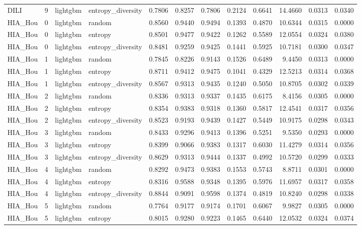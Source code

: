 \begin{tabular}{lrllrrrrrrrr}
DILI & 9 & lightgbm & entropy_diversity & 0.7806 & 0.8257 & 0.7806 & 0.2124 & 0.6641 & 14.4660 & 0.0313 & 0.0340 \\
HIA_Hou & 0 & lightgbm & random & 0.8560 & 0.9440 & 0.9494 & 0.1393 & 0.4870 & 10.6344 & 0.0315 & 0.0000 \\
HIA_Hou & 0 & lightgbm & entropy & 0.8501 & 0.9477 & 0.9422 & 0.1262 & 0.5589 & 12.0554 & 0.0324 & 0.0380 \\
HIA_Hou & 0 & lightgbm & entropy_diversity & 0.8481 & 0.9259 & 0.9425 & 0.1441 & 0.5925 & 10.7181 & 0.0300 & 0.0347 \\
HIA_Hou & 1 & lightgbm & random & 0.7845 & 0.8226 & 0.9143 & 0.1526 & 0.6489 & 9.4450 & 0.0313 & 0.0000 \\
HIA_Hou & 1 & lightgbm & entropy & 0.8711 & 0.9412 & 0.9475 & 0.1041 & 0.4329 & 12.5213 & 0.0314 & 0.0368 \\
HIA_Hou & 1 & lightgbm & entropy_diversity & 0.8567 & 0.9313 & 0.9435 & 0.1240 & 0.5050 & 10.8705 & 0.0302 & 0.0339 \\
HIA_Hou & 2 & lightgbm & random & 0.8336 & 0.9313 & 0.9337 & 0.1435 & 0.6175 & 8.4156 & 0.0305 & 0.0000 \\
HIA_Hou & 2 & lightgbm & entropy & 0.8354 & 0.9383 & 0.9318 & 0.1360 & 0.5817 & 12.4541 & 0.0317 & 0.0356 \\
HIA_Hou & 2 & lightgbm & entropy_diversity & 0.8523 & 0.9193 & 0.9439 & 0.1427 & 0.5449 & 10.9175 & 0.0298 & 0.0343 \\
HIA_Hou & 3 & lightgbm & random & 0.8433 & 0.9296 & 0.9413 & 0.1396 & 0.5251 & 9.5350 & 0.0293 & 0.0000 \\
HIA_Hou & 3 & lightgbm & entropy & 0.8399 & 0.9066 & 0.9383 & 0.1317 & 0.6030 & 11.4279 & 0.0314 & 0.0356 \\
HIA_Hou & 3 & lightgbm & entropy_diversity & 0.8629 & 0.9313 & 0.9444 & 0.1337 & 0.4992 & 10.5720 & 0.0299 & 0.0333 \\
HIA_Hou & 4 & lightgbm & random & 0.8292 & 0.9473 & 0.9383 & 0.1553 & 0.5743 & 8.8711 & 0.0301 & 0.0000 \\
HIA_Hou & 4 & lightgbm & entropy & 0.8316 & 0.9588 & 0.9348 & 0.1395 & 0.5976 & 11.6957 & 0.0317 & 0.0358 \\
HIA_Hou & 4 & lightgbm & entropy_diversity & 0.8844 & 0.9091 & 0.9598 & 0.1374 & 0.4819 & 10.8240 & 0.0298 & 0.0338 \\
HIA_Hou & 5 & lightgbm & random & 0.7764 & 0.9177 & 0.9174 & 0.1701 & 0.6067 & 9.9827 & 0.0305 & 0.0000 \\
HIA_Hou & 5 & lightgbm & entropy & 0.8015 & 0.9280 & 0.9223 & 0.1465 & 0.6440 & 12.0532 & 0.0324 & 0.0374 \\

\end{tabular}
